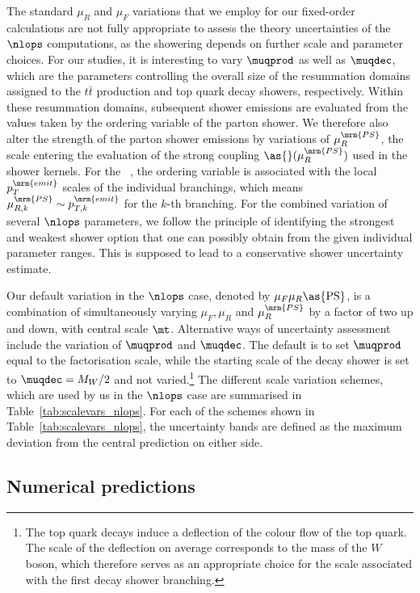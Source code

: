 The standard $\mu_R$ and $\mu_F$ variations that we employ for our
fixed-order calculations are not fully appropriate to assess the
theory uncertainties of the $\nlops$ computations, as the
showering depends on further scale and parameter choices. For our
studies, it is interesting to vary $\muqprod$ as well as
$\muqdec$, which are the parameters controlling the overall size of
the resummation domains assigned to the $t\bar t$ production and top
quark decay showers, respectively. 
Within these resummation domains, subsequent shower emissions are
evaluated from the values taken by the ordering variable of the parton
shower.
We therefore also alter the strength
of the parton shower emissions by variations of 
$\mu_R^\mrm{PS}$, the scale entering the evaluation of the strong coupling
$\as{}(\mu_R^\mrm{PS})$ used in the shower kernels. For the
~, the ordering variable is associated with
the local $p_T^\mrm{emit}$ scales of the individual branchings, which
means $\mu_{R,k}^\mrm{PS}\sim p_{T,k}^\mrm{emit}$ for the $k$-th branching.
%
For the combined variation of several
$\nlops$ parameters, we follow the principle of identifying the
strongest and weakest shower option that one can possibly obtain from
the given individual parameter ranges. This is supposed to lead to a
conservative shower uncertainty estimate.

Our default variation in the $\nlops$ case, denoted by
$\mu_F\mu_R\as{\mathrm{PS}}$, is a
combination of simultaneously varying $\mu_F, \mu_R$ and $\mu_R^\mrm{PS}$ by a factor of
two up and down, with central scale $\mt$.
Alternative ways of uncertainty assessment include the variation of $\muqprod$ and $\muqdec$. 
The  default is to set  $\muqprod$  equal to
the factorisation scale, while the starting scale of the decay shower
is set to $\muqdec=M_W/2$ and not varied.\footnote{%
  The top quark decays induce a deflection of the colour flow of the
   top quark. The scale of the deflection on average
  corresponds to the mass of the $W$ boson, which therefore serves as
  an appropriate choice for the scale associated with the
  first decay shower branching.}
The different scale variation schemes, which are used by us in the $\nlops$ case are summarised in Table~\ref{tab:scalevars_nlops}.
For each of the schemes shown in Table~\ref{tab:scalevars_nlops}, the uncertainty bands are defined as
the maximum deviation from the central prediction on either side.


\subsection{Numerical predictions}

